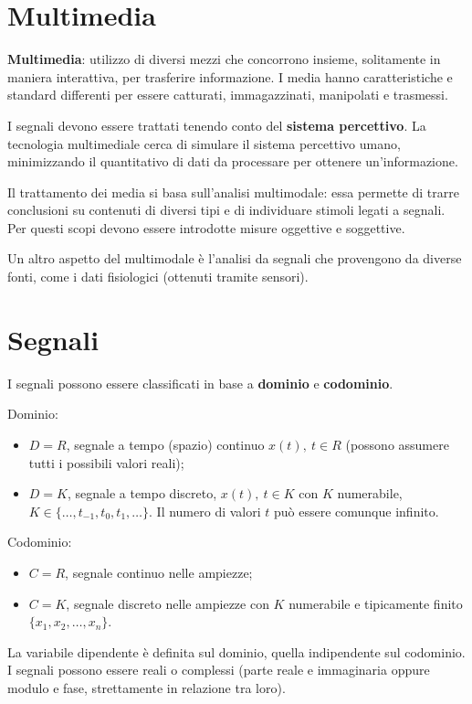 \section{Multimedia}
\textbf{Multimedia}: utilizzo di diversi mezzi che concorrono insieme, solitamente in maniera interattiva, per trasferire informazione. I media hanno caratteristiche e standard differenti per essere catturati, immagazzinati, manipolati e trasmessi.

I segnali devono essere trattati tenendo conto del \textbf{sistema percettivo}. La tecnologia multimediale cerca di simulare il sistema percettivo umano, minimizzando il quantitativo di dati da processare per ottenere un'informazione.

Il trattamento dei media si basa sull'analisi multimodale: essa permette di trarre conclusioni su contenuti di diversi tipi e di individuare stimoli legati a segnali. Per questi scopi devono essere introdotte misure oggettive e soggettive.

Un altro aspetto del multimodale è l'analisi da segnali che provengono da diverse fonti, come i dati fisiologici (ottenuti tramite sensori). 

\section{Segnali}
I segnali possono essere classificati in base a \textbf{dominio} e \textbf{codominio}.

Dominio: 
\begin{itemize}
	\item $D = R$, segnale a tempo (spazio) continuo $x(t),\: t \in R$ (possono assumere tutti i possibili valori reali);
	\item $D = K$, segnale a tempo discreto, $x(t),\: t \in K$ con $K$ numerabile, $K \in \{\dots, t_{-1}, t_0, t_1, \dots\}$. Il numero di valori $t$ può essere comunque infinito.
\end{itemize}

Codominio:
\begin{itemize}
	\item $C = R$, segnale continuo nelle ampiezze;
	\item $C = K$, segnale discreto nelle ampiezze con $K$ numerabile e tipicamente finito $\{x_1, x_2, \dots, x_n\}$.
\end{itemize}

La variabile dipendente è definita sul dominio, quella indipendente sul codominio. I segnali possono essere reali o complessi (parte reale e immaginaria oppure modulo e fase, strettamente in relazione tra loro).

